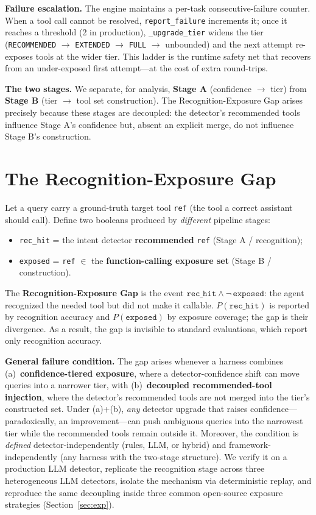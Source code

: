 \textbf{Failure escalation.} The engine maintains a per-task consecutive-failure counter. When a tool call cannot be resolved, \texttt{report\_failure} increments it; once it reaches a threshold (2 in production), \texttt{\_upgrade\_tier} widens the tier (\texttt{RECOMMENDED} $\rightarrow$ \texttt{EXTENDED} $\rightarrow$ \texttt{FULL} $\rightarrow$ unbounded) and the next attempt re-exposes tools at the wider tier. This ladder is the runtime safety net that recovers from an under-exposed first attempt---at the cost of extra round-trips.

\textbf{The two stages.} We separate, for analysis, \textbf{Stage A} (confidence $\rightarrow$ tier) from \textbf{Stage B} (tier $\rightarrow$ tool set construction). The Recognition-Exposure Gap arises precisely because these stages are decoupled: the detector's recommended tools influence Stage A's confidence but, absent an explicit merge, do not influence Stage B's construction.

\section{The Recognition-Exposure Gap}
\label{sec:gap}

Let a query carry a ground-truth target tool \texttt{ref} (the tool a correct assistant should call). Define two booleans produced by \emph{different} pipeline stages:
\begin{itemize}
  \item \texttt{rec\_hit} = the intent detector \textbf{recommended} \texttt{ref} (Stage A / recognition);
  \item \texttt{exposed} = \texttt{ref} $\in$ the \textbf{function-calling exposure set} (Stage B / construction).
\end{itemize}

The \textbf{Recognition-Exposure Gap} is the event $\texttt{rec\_hit} \wedge \neg\,\texttt{exposed}$: the agent recognized the needed tool but did not make it callable. $P(\texttt{rec\_hit})$ is reported by recognition accuracy and $P(\texttt{exposed})$ by exposure coverage; the gap is their divergence. As a result, the gap is invisible to standard evaluations, which report only recognition accuracy.

\textbf{General failure condition.} The gap arises whenever a harness combines (a)~\textbf{confidence-tiered exposure}, where a detector-confidence shift can move queries into a narrower tier, with (b)~\textbf{decoupled recommended-tool injection}, where the detector's recommended tools are not merged into the tier's constructed set. Under (a)+(b), \emph{any} detector upgrade that raises confidence---paradoxically, an improvement---can push ambiguous queries into the narrowest tier while the recommended tools remain outside it. Moreover, the condition is \emph{defined} detector-independently (rules, LLM, or hybrid) and framework-independently (any harness with the two-stage structure). We verify it on a production LLM detector, replicate the recognition stage across three heterogeneous LLM detectors, isolate the mechanism via deterministic replay, and reproduce the same decoupling inside three common open-source exposure strategies (Section~\ref{sec:exp}).

